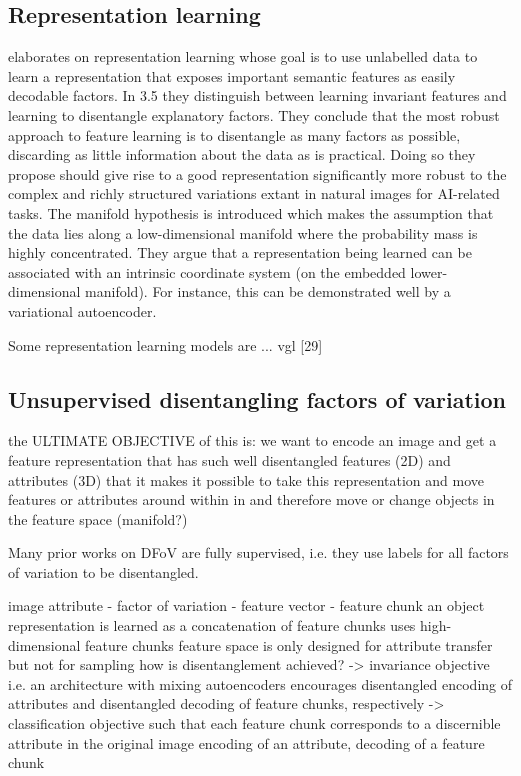 \documentclass[12pt,a4paper]{article}
\begin{document}
\subsection{Representation learning}
\par\cite{1206.5538} elaborates on representation learning whose goal is to use unlabelled data to learn a representation that exposes important semantic features as easily decodable factors. In 3.5 they distinguish between learning invariant features and learning to disentangle explanatory factors. They conclude that the most robust approach to feature learning is to disentangle as many factors as possible, discarding as little information about the data as is practical. Doing so they propose should give rise to a good representation significantly more robust to the complex and richly structured variations extant in natural images for AI-related tasks. The manifold hypothesis is introduced which makes the assumption that the data lies along a low-dimensional manifold where the probability mass is highly concentrated. They argue that a representation being learned can be associated with an intrinsic coordinate system (on the embedded lower-dimensional manifold). For instance, this can be demonstrated well by a variational autoencoder.

Some representation learning models are ... vgl [29]

\subsection{Unsupervised disentangling factors of variation}
\par the ULTIMATE OBJECTIVE of this is: we want to encode an image and get a feature representation that has such well disentangled features (2D) and attributes (3D) that it makes it possible to take this representation and move features or attributes around within in and therefore move or change objects in the feature space (manifold?)

\par Many prior works on DFoV are fully supervised, i.e. they use labels for all factors of variation to be disentangled.

\par image attribute - factor of variation - feature vector - feature chunk
an object representation is learned as a concatenation of feature chunks
uses high-dimensional feature chunks
feature space is only designed for attribute transfer but not for sampling
how is disentanglement achieved? 
-> invariance objective i.e. an architecture with mixing autoencoders encourages disentangled encoding of attributes and disentangled decoding of feature chunks, respectively
-> classification objective such that each feature chunk corresponds to a discernible attribute in the original image 
encoding of an attribute, decoding of a feature chunk
\end{document}
